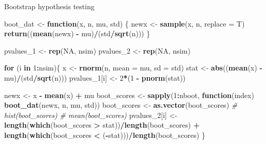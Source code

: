 \documentclass[
  ignorenonframetext,
]{beamer}
\newenvironment{Shaded}{\begin{snugshade}}{\end{snugshade}}
\newcommand{\AttributeTok}[1]{\textcolor[rgb]{0.13,0.29,0.53}{#1}}
\newcommand{\CommentTok}[1]{\textcolor[rgb]{0.56,0.35,0.01}{\textit{#1}}}
\newcommand{\ConstantTok}[1]{\textcolor[rgb]{0.56,0.35,0.01}{#1}}
\newcommand{\ControlFlowTok}[1]{\textcolor[rgb]{0.13,0.29,0.53}{\textbf{#1}}}
\newcommand{\DecValTok}[1]{\textcolor[rgb]{0.00,0.00,0.81}{#1}}
\newcommand{\FunctionTok}[1]{\textcolor[rgb]{0.13,0.29,0.53}{\textbf{#1}}}
\newcommand{\NormalTok}[1]{#1}
\newcommand{\OtherTok}[1]{\textcolor[rgb]{0.56,0.35,0.01}{#1}}
\newcommand{\SpecialCharTok}[1]{\textcolor[rgb]{0.81,0.36,0.00}{\textbf{#1}}}
\begin{document}
\begin{frame}[fragile]{Bootstrap hypothesis testing}
\protect{}\label{bootstrap-hypothesis-testing}
\tiny

\begin{Shaded}
\begin{Highlighting}[]
\NormalTok{boot\_dat }\OtherTok{\textless{}{-}} \ControlFlowTok{function}\NormalTok{(x, n, mu, std) \{}
\NormalTok{  newx }\OtherTok{\textless{}{-}} \FunctionTok{sample}\NormalTok{(x, n, }\AttributeTok{replace =}\NormalTok{ T)}
  \FunctionTok{return}\NormalTok{((}\FunctionTok{mean}\NormalTok{(newx) }\SpecialCharTok{{-}}\NormalTok{ mu)}\SpecialCharTok{/}\NormalTok{(std}\SpecialCharTok{/}\FunctionTok{sqrt}\NormalTok{(n)))}
\NormalTok{\}}


\NormalTok{pvalues\_1 }\OtherTok{\textless{}{-}} \FunctionTok{rep}\NormalTok{(}\ConstantTok{NA}\NormalTok{, nsim)}
\NormalTok{pvalues\_2 }\OtherTok{\textless{}{-}} \FunctionTok{rep}\NormalTok{(}\ConstantTok{NA}\NormalTok{, nsim)}

\ControlFlowTok{for}\NormalTok{ (i }\ControlFlowTok{in} \DecValTok{1}\SpecialCharTok{:}\NormalTok{nsim)\{}
\NormalTok{  x }\OtherTok{\textless{}{-}} \FunctionTok{rnorm}\NormalTok{(n, }\AttributeTok{mean =}\NormalTok{ mu, }\AttributeTok{sd =}\NormalTok{ std)}
\NormalTok{  stat }\OtherTok{\textless{}{-}} \FunctionTok{abs}\NormalTok{((}\FunctionTok{mean}\NormalTok{(x) }\SpecialCharTok{{-}}\NormalTok{ mu)}\SpecialCharTok{/}\NormalTok{(std}\SpecialCharTok{/}\FunctionTok{sqrt}\NormalTok{(n)))}
\NormalTok{  pvalues\_1[i] }\OtherTok{\textless{}{-}} \DecValTok{2}\SpecialCharTok{*}\NormalTok{(}\DecValTok{1} \SpecialCharTok{{-}} \FunctionTok{pnorm}\NormalTok{(stat))}
  
  
\NormalTok{  newx }\OtherTok{\textless{}{-}}\NormalTok{ x }\SpecialCharTok{{-}} \FunctionTok{mean}\NormalTok{(x) }\SpecialCharTok{+}\NormalTok{ mu}
\NormalTok{  boot\_scores }\OtherTok{\textless{}{-}} \FunctionTok{sapply}\NormalTok{(}\DecValTok{1}\SpecialCharTok{:}\NormalTok{nboot, }
                        \ControlFlowTok{function}\NormalTok{(index) }\FunctionTok{boot\_dat}\NormalTok{(newx, n, mu, std))}
\NormalTok{  boot\_scores }\OtherTok{\textless{}{-}} \FunctionTok{as.vector}\NormalTok{(boot\_scores)}
  \CommentTok{\# hist(boot\_scores)}
  \CommentTok{\# mean(boot\_scores)}
\NormalTok{  pvalues\_2[i] }\OtherTok{\textless{}{-}} \FunctionTok{length}\NormalTok{(}\FunctionTok{which}\NormalTok{(boot\_scores }\SpecialCharTok{\textgreater{}}\NormalTok{ stat))}\SpecialCharTok{/}\FunctionTok{length}\NormalTok{(boot\_scores) }\SpecialCharTok{+} 
    \FunctionTok{length}\NormalTok{(}\FunctionTok{which}\NormalTok{(boot\_scores }\SpecialCharTok{\textless{}}\NormalTok{ (}\SpecialCharTok{{-}}\NormalTok{stat)))}\SpecialCharTok{/}\FunctionTok{length}\NormalTok{(boot\_scores)}
\NormalTok{\}}
\end{Highlighting}
\end{Shaded}
\end{frame}
\end{document}
